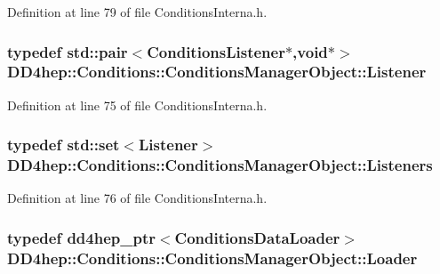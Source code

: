 Definition at line 79 of file ConditionsInterna.h.\hypertarget{class_d_d4hep_1_1_conditions_1_1_conditions_manager_object_ac4cd1e3a448bc1f8bae384d194f10c23}{
\subsubsection[{Listener}]{\setlength{\rightskip}{0pt plus 5cm}typedef std::pair$<${\bf ConditionsListener}$\ast$,void$\ast$$>$ {\bf DD4hep::Conditions::ConditionsManagerObject::Listener}}}
\label{class_d_d4hep_1_1_conditions_1_1_conditions_manager_object_ac4cd1e3a448bc1f8bae384d194f10c23}


Definition at line 75 of file ConditionsInterna.h.\hypertarget{class_d_d4hep_1_1_conditions_1_1_conditions_manager_object_aba0162524bc90a39e30bd5f1f0067ee2}{
\subsubsection[{Listeners}]{\setlength{\rightskip}{0pt plus 5cm}typedef std::set$<${\bf Listener}$>$ {\bf DD4hep::Conditions::ConditionsManagerObject::Listeners}}}
\label{class_d_d4hep_1_1_conditions_1_1_conditions_manager_object_aba0162524bc90a39e30bd5f1f0067ee2}


Definition at line 76 of file ConditionsInterna.h.\hypertarget{class_d_d4hep_1_1_conditions_1_1_conditions_manager_object_ab2df3fc6386b7f71ed3087271d90acc6}{
\subsubsection[{Loader}]{\setlength{\rightskip}{0pt plus 5cm}typedef {\bf dd4hep\_\-ptr}$<${\bf ConditionsDataLoader}$>$ {\bf DD4hep::Conditions::ConditionsManagerObject::Loader}}}
\label{class_d_d4hep_1_1_conditions_1_1_conditions_manager_object_ab2df3fc6386b7f71ed3087271d90acc6}


